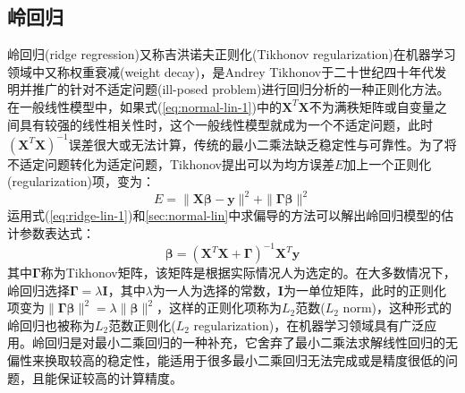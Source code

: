 \documentclass[a4paper]{ctexart}
\begin{document}
\begin{spacing}{1.3}
	\subsection{岭回归}
	岭回归(ridge regression)又称吉洪诺夫正则化(Tikhonov regularization)在机器学习领域中又称权重衰减(weight decay)，是Andrey Tikhonov于二十世纪四十年代发明并推广的针对不适定问题(ill-posed problem)进行回归分析的一种正则化方法\cite{RN79}。在一般线性模型中，如果式(\ref{eq:normal-lin-1})中的$\bm{X}^T\bm{X}$不为满秩矩阵或自变量之间具有较强的线性相关性时，这个一般线性模型就成为一个不适定问题，此时$(\bm{X}^T\bm{X})^{-1}$误差很大或无法计算，传统的最小二乘法缺乏稳定性与可靠性。为了将不适定问题转化为适定问题，Tikhonov提出可以为均方误差$E$加上一个正则化(regularization)项，变为：
	\begin{equation}\label{eq:ridge-lin-1}
	E=\|\bm{X\beta-y}\|^2+\|\bm{\Gamma \beta}\|^2
	\end{equation}
	运用式(\ref{eq:ridge-lin-1})和\ref{sec:normal-lin}中求偏导的方法可以解出岭回归模型的估计参数表达式：
	\begin{equation}
	\bm{\beta}=(\bm{X}^T\bm{X}+\bm{\Gamma})^{-1}\bm{X}^T\bm{y}
	\end{equation}
	其中$\bm{\Gamma}$称为Tikhonov矩阵，该矩阵是根据实际情况人为选定的。在大多数情况下，岭回归选择$\bm{\Gamma}=\lambda\bm{I}$，其中$\lambda$为一人为选择的常数，$\bm{I}$为一单位矩阵，此时的正则化项变为$\|\bm{\Gamma \beta}\|^2=\lambda\|\bm{\beta}\|^2$，这样的正则化项称为$L_2$范数($L_2$ norm)，这种形式的岭回归也被称为$L_2$范数正则化($L_2$ regularization)，在机器学习领域具有广泛应用\cite{RN82}。岭回归是对最小二乘回归的一种补充，它舍弃了最小二乘法求解线性回归的无偏性来换取较高的稳定性，能适用于很多最小二乘回归无法完成或是精度很低的问题，且能保证较高的计算精度\cite{RN80}。
	

\end{spacing}
\end{document}
